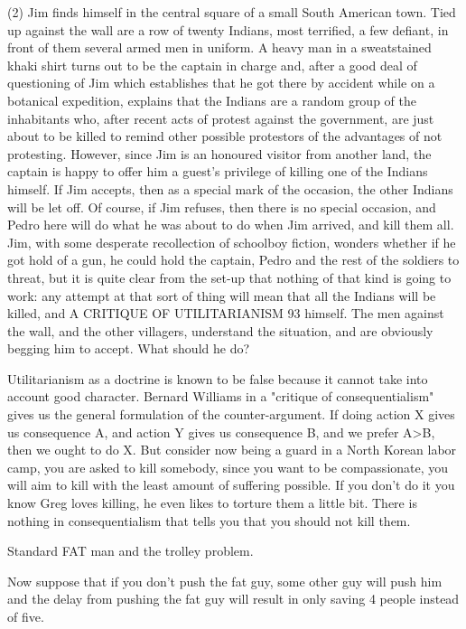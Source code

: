 (2) Jim finds himself in the central square of a small South American town.
Tied up against the wall are a row of twenty Indians, most terrified, a few
defiant, in front of them several armed men in uniform. A heavy man in a sweatstained khaki shirt turns out to be the captain in charge and, after a good deal of
questioning of Jim which establishes that he got there by accident while on a
botanical expedition, explains that the Indians are a random group of the
inhabitants who, after recent acts of protest against the government, are just about
to be killed to remind other possible protestors of the advantages of not
protesting. However, since Jim is an honoured visitor from another land, the
captain is happy to offer him a guest’s privilege of killing one of the Indians
himself. If Jim accepts, then as a special mark of the occasion, the other Indians
will be let off. Of course, if Jim refuses, then there is no special occasion, and
Pedro here will do what he was about to do when Jim arrived, and kill them all. Jim,
with some desperate recollection of schoolboy fiction, wonders whether if he got
hold of a gun, he could hold the captain, Pedro and the rest of the soldiers to
threat, but it is quite clear from the set-up that nothing of that kind is going to work:
any attempt at that sort of thing will mean that all the Indians will be killed, and
A CRITIQUE OF UTILITARIANISM 93
himself. The men against the wall, and the other villagers, understand the
situation, and are obviously begging him to accept. What should he do?

Utilitarianism as a doctrine is known to be false because it cannot take into account good character. Bernard Williams in a "critique of consequentialism" gives us the general formulation of the counter-argument. If doing action X gives us consequence A, and action Y gives us consequence B, and we prefer A>B, then we ought to do X. But consider now being a guard in a North Korean labor camp, you are asked to kill somebody, since you want to be compassionate, you will aim to kill with the least amount of suffering possible. If you don't do it you know Greg loves killing, he even likes to torture them a little bit. There is nothing in consequentialism that tells you that you should not kill them. 

Standard FAT man and the trolley problem. 

Now suppose that if you don't push the fat guy, some other guy will push him and the delay from pushing the fat guy will result in only saving 4 people instead of five. 


